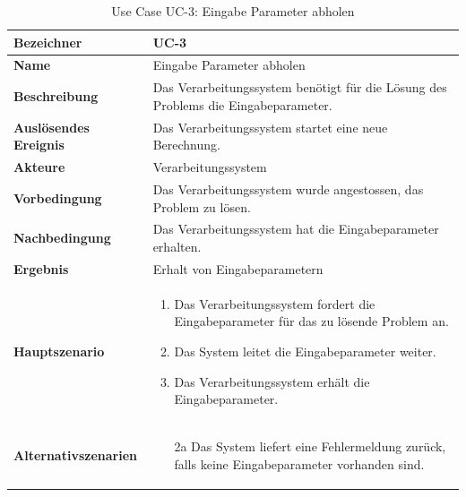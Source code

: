 \begin{table}[ht]
\centering
  \begin{tabular}{ l | p{10cm} }
	\hline
	\rowcolor{gray}
	\textbf{Bezeichner}	&	\textbf{UC-3}\\ \hline
	\textbf{Name}			&	Eingabe Parameter abholen\\ \hline
	\textbf{Beschreibung}	&	Das Verarbeitungssystem benötigt für die Lösung des Problems die Eingabeparameter.\\ \hline
	\textbf{Auslösendes Ereignis}&	Das Verarbeitungssystem startet eine neue Berechnung.\\ \hline
	\textbf{Akteure}		&	Verarbeitungssystem\\ \hline
	\textbf{Vorbedingung}	&	Das Verarbeitungssystem wurde angestossen, das Problem zu lösen.\\ \hline
	\textbf{Nachbedingung}	&	Das Verarbeitungssystem hat die Eingabeparameter erhalten.\\ \hline
	\textbf{Ergebnis}		&	Erhalt von Eingabeparametern\\ \hline
	\textbf{Hauptszenario}	&	\begin{enumerate}
					\item Das Verarbeitungssystem fordert die Eingabeparameter für das zu lösende Problem an.
					\item Das System leitet die Eingabeparameter weiter.
					\item Das Verarbeitungssystem erhält die Eingabeparameter.
					\end{enumerate}
					\\ \hline
	\textbf{Alternativszenarien}	&	\begin{enumerate}
					\item[2a] Das System liefert eine Fehlermeldung zurück, falls keine Eingabeparameter vorhanden sind.
					\end{enumerate}
					\\ \hline
  \end{tabular}
   \caption{Use Case UC-3: Eingabe Parameter abholen}\label{table:use_case_3}
\end{table}


